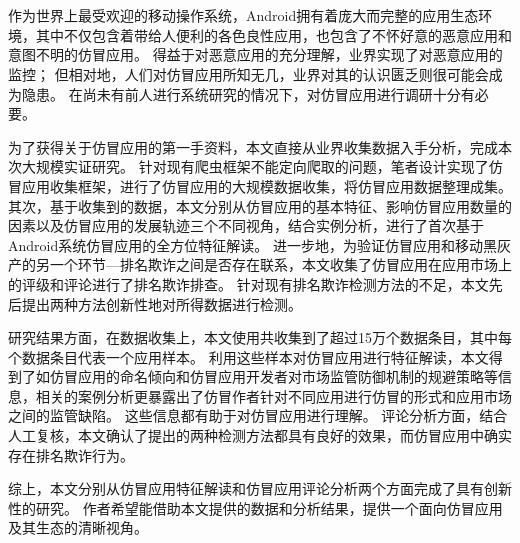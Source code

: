 \cleardoublepage{}

\chapter*{}
\vspace{-5mm}

\setlength{\baselineskip}{25pt} %

作为世界上最受欢迎的移动操作系统，Android拥有着庞大而完整的应用生态环境，其中不仅包含着带给人便利的各色良性应用，也包含了不怀好意的恶意应用和意图不明的仿冒应用。
得益于对恶意应用的充分理解，业界实现了对恶意应用的监控；
但相对地，人们对仿冒应用所知无几，业界对其的认识匮乏则很可能会成为隐患。
在尚未有前人进行系统研究的情况下，对仿冒应用进行调研十分有必要。

为了获得关于仿冒应用的第一手资料，本文直接从业界收集数据入手分析，完成本次大规模实证研究。
针对现有爬虫框架不能定向爬取的问题，笔者设计实现了仿冒应用收集框架\mytool ，进行了仿冒应用的大规模数据收集，将仿冒应用数据整理成集。
其次，基于收集到的数据，本文分别从仿冒应用的基本特征、影响仿冒应用数量的因素以及仿冒应用的发展轨迹三个不同视角，结合实例分析，进行了首次基于Android系统仿冒应用的全方位特征解读。
进一步地，为验证仿冒应用和移动黑灰产的另一个环节---排名欺诈之间是否存在联系，本文收集了仿冒应用在应用市场上的评级和评论进行了排名欺诈排查。
针对现有排名欺诈检测方法的不足，本文先后提出两种方法创新性地对所得数据进行检测。

研究结果方面，在数据收集上，本文使用\mytool 共收集到了超过15万个数据条目，其中每个数据条目代表一个应用样本。
利用这些样本对仿冒应用进行特征解读，本文得到了如仿冒应用的命名倾向和仿冒应用开发者对市场监管防御机制的规避策略等信息，相关的案例分析更暴露出了仿冒作者针对不同应用进行仿冒的形式和应用市场之间的监管缺陷。
这些信息都有助于对仿冒应用进行理解。
评论分析方面，结合人工复核，本文确认了提出的两种检测方法都具有良好的效果，而仿冒应用中确实存在排名欺诈行为。

综上，本文分别从仿冒应用特征解读和仿冒应用评论分析两个方面完成了具有创新性的研究。
作者希望能借助本文提供的数据和分析结果，提供一个面向仿冒应用及其生态的清晰视角。

 
